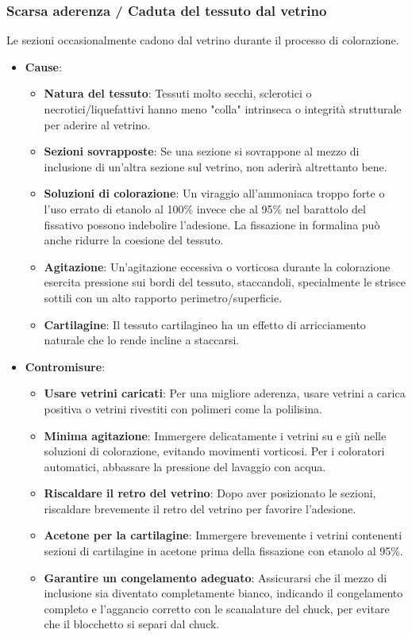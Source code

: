 \subsubsection{Scarsa aderenza / Caduta del tessuto dal vetrino}
Le sezioni occasionalmente cadono dal vetrino durante il processo di colorazione. 
\begin{itemize}
    \item   \textbf{Cause}:
    \begin{itemize}
        \item   \textbf{Natura del tessuto}: Tessuti molto secchi, sclerotici o necrotici/liquefattivi hanno meno "colla" intrinseca o integrità strutturale per aderire al vetrino. 
        \item   \textbf{Sezioni sovrapposte}: Se una sezione si sovrappone al mezzo di inclusione di un'altra sezione sul vetrino, non aderirà altrettanto bene. 
        \item   \textbf{Soluzioni di colorazione}: Un viraggio all'ammoniaca troppo forte o l'uso errato di etanolo al 100\% invece che al 95\% nel barattolo del fissativo possono indebolire l'adesione.  La fissazione in formalina può anche ridurre la coesione del tessuto.
        \item   \textbf{Agitazione}: Un'agitazione eccessiva o vorticosa durante la colorazione esercita pressione sui bordi del tessuto, staccandoli, specialmente le strisce sottili con un alto rapporto perimetro/superficie. 
        \item   \textbf{Cartilagine}: Il tessuto cartilagineo ha un effetto di arricciamento naturale che lo rende incline a staccarsi. 
    \end{itemize}
    \item   \textbf{Contromisure}:
    \begin{itemize}
        \item   \textbf{Usare vetrini caricati}: Per una migliore aderenza, usare vetrini a carica positiva o vetrini rivestiti con polimeri come la polilisina. 
        \item   \textbf{Minima agitazione}: Immergere delicatamente i vetrini su e giù nelle soluzioni di colorazione, evitando movimenti vorticosi.  Per i coloratori automatici, abbassare la pressione del lavaggio con acqua.
        \item   \textbf{Riscaldare il retro del vetrino}: Dopo aver posizionato le sezioni, riscaldare brevemente il retro del vetrino per favorire l'adesione. 
        \item   \textbf{Acetone per la cartilagine}: Immergere brevemente i vetrini contenenti sezioni di cartilagine in acetone prima della fissazione con etanolo al 95\%. 
        \item   \textbf{Garantire un congelamento adeguato}: Assicurarsi che il mezzo di inclusione sia diventato completamente bianco, indicando il congelamento completo e l'aggancio corretto con le scanalature del chuck, per evitare che il blocchetto si separi dal chuck. 
    \end{itemize}
\end{itemize}



